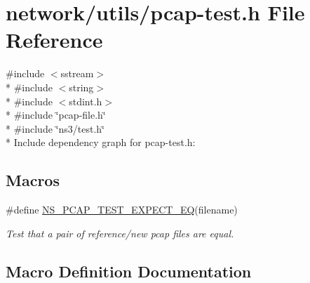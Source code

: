 \hypertarget{pcap-test_8h}{}\section{network/utils/pcap-\/test.h File Reference}
\label{pcap-test_8h}
{\ttfamily \#include $<$sstream$>$}\\*
{\ttfamily \#include $<$string$>$}\\*
{\ttfamily \#include $<$stdint.\+h$>$}\\*
{\ttfamily \#include \char`\"{}pcap-\/file.\+h\char`\"{}}\\*
{\ttfamily \#include \char`\"{}ns3/test.\+h\char`\"{}}\\*
Include dependency graph for pcap-\/test.h\+:
\subsection*{Macros}
\begin{DoxyCompactItemize}
\item 
\#define \hyperlink{pcap-test_8h_a38f2c17a62d8613f78ec2dd7b638d329}{N\+S\+\_\+\+P\+C\+A\+P\+\_\+\+T\+E\+S\+T\+\_\+\+E\+X\+P\+E\+C\+T\+\_\+\+EQ}(filename)
\begin{DoxyCompactList}\small\item\em Test that a pair of reference/new pcap files are equal. \end{DoxyCompactList}\end{DoxyCompactItemize}


\subsection{Macro Definition Documentation}
